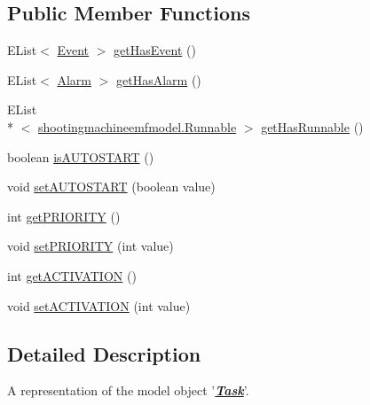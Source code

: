 \subsection*{Public Member Functions}
\begin{DoxyCompactItemize}
\item 
E\-List$<$ \hyperlink{interfaceshootingmachineemfmodel_1_1_event}{Event} $>$ \hyperlink{interfaceshootingmachineemfmodel_1_1_task_a0d43845d3a329710b813f0f9ae91fafa}{get\-Has\-Event} ()
\item 
E\-List$<$ \hyperlink{interfaceshootingmachineemfmodel_1_1_alarm}{Alarm} $>$ \hyperlink{interfaceshootingmachineemfmodel_1_1_task_ae7ed7658dcae365e90ba12082056cf8a}{get\-Has\-Alarm} ()
\item 
E\-List\\*
$<$ \hyperlink{interfaceshootingmachineemfmodel_1_1_runnable}{shootingmachineemfmodel.\-Runnable} $>$ \hyperlink{interfaceshootingmachineemfmodel_1_1_task_a807fff9c05f8e96455aad5410e82954e}{get\-Has\-Runnable} ()
\item 
boolean \hyperlink{interfaceshootingmachineemfmodel_1_1_task_a2f59df27a3a4de3689c8c5555d4250b0}{is\-A\-U\-T\-O\-S\-T\-A\-R\-T} ()
\item 
void \hyperlink{interfaceshootingmachineemfmodel_1_1_task_acdf427155323d9fa22da53812e3ffce8}{set\-A\-U\-T\-O\-S\-T\-A\-R\-T} (boolean value)
\item 
int \hyperlink{interfaceshootingmachineemfmodel_1_1_task_aecaf4e30f667e49d51a126bd32888f12}{get\-P\-R\-I\-O\-R\-I\-T\-Y} ()
\item 
void \hyperlink{interfaceshootingmachineemfmodel_1_1_task_ad783d7458a6af950e1852369c559b3fd}{set\-P\-R\-I\-O\-R\-I\-T\-Y} (int value)
\item 
int \hyperlink{interfaceshootingmachineemfmodel_1_1_task_a7c2663601b26ebebf35a28a950292fdc}{get\-A\-C\-T\-I\-V\-A\-T\-I\-O\-N} ()
\item 
void \hyperlink{interfaceshootingmachineemfmodel_1_1_task_a08871323a52aad627f7f20d9993131d9}{set\-A\-C\-T\-I\-V\-A\-T\-I\-O\-N} (int value)
\end{DoxyCompactItemize}


\subsection{Detailed Description}
A representation of the model object '{\itshape {\bfseries \hyperlink{interfaceshootingmachineemfmodel_1_1_task}{Task}}}'.

